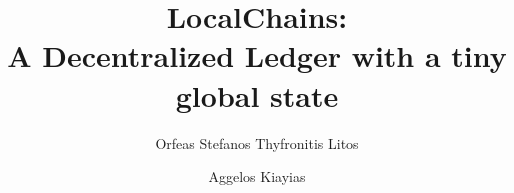 \title{LocalChains: \\ A Decentralized Ledger with a tiny global state}
\author{Orfeas Stefanos Thyfronitis Litos \and Aggelos Kiayias}
\maketitle
